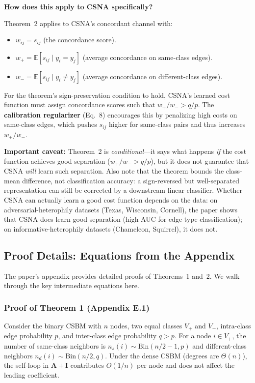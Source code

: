 \documentclass[11pt,a4paper]{article}
\newcommand{\E}{\mathbb{E}}
\theoremstyle{definition}
\theoremstyle{plain}
\begin{document}
\textbf{How does this apply to CSNA specifically?}

Theorem~2 applies to CSNA's concordant channel with:
\begin{itemize}[nosep]
  \item $w_{ij} = s_{ij}$ (the concordance score).
  \item $w_+ = \E[s_{ij} \mid y_i = y_j]$ (average concordance on same-class edges).
  \item $w_- = \E[s_{ij} \mid y_i \neq y_j]$ (average concordance on different-class edges).
\end{itemize}

For the theorem's sign-preservation condition to hold, CSNA's learned cost function
must assign concordance scores such that $w_+/w_- > q/p$.
The \textbf{calibration regularizer} (Eq.~8) encourages this by penalizing high costs
on same-class edges, which pushes $s_{ij}$ higher for same-class pairs and thus
increases $w_+/w_-$.

\textbf{Important caveat:}
Theorem~2 is \emph{conditional}---it says what happens \emph{if} the cost function
achieves good separation ($w_+/w_- > q/p$), but it does not guarantee that CSNA
\emph{will} learn such separation.
Also note that the theorem bounds the class-mean difference, not classification accuracy:
a sign-reversed but well-separated representation can still be corrected by a
downstream linear classifier.
Whether CSNA can actually learn a good cost function depends on the data: on
adversarial-heterophily datasets (Texas, Wisconsin, Cornell), the paper shows
that CSNA does learn good separation (high AUC for edge-type classification);
on informative-heterophily datasets (Chameleon, Squirrel), it does not.


\subsection{Proof Details: Equations from the Appendix}
\label{sec:proof_details}

The paper's appendix provides detailed proofs of Theorems~1 and~2.
We walk through the key intermediate equations here.

\subsubsection{Proof of Theorem 1 (Appendix E.1)}

Consider the binary CSBM with $n$ nodes, two equal classes $V_+$ and $V_-$,
intra-class edge probability $p$, and inter-class edge probability $q > p$.
For a node $i \in V_+$, the number of same-class neighbors is
$n_s(i) \sim \mathrm{Bin}(n/2 - 1, p)$ and different-class neighbors
$n_d(i) \sim \mathrm{Bin}(n/2, q)$.
Under the dense CSBM (degrees are $\Theta(n)$), the self-loop in
$\mathbf{A} + \mathbf{I}$ contributes $O(1/n)$ per node and does not affect
the leading coefficient.
\end{document}

